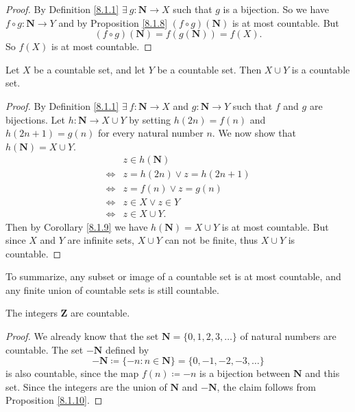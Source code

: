 \begin{proof}
    By Definition \ref{8.1.1} \(\exists\ g : \mathbf{N} \to X\) such that \(g\) is a bijection.
    So we have \(f \circ g : \mathbf{N} \to Y\) and by Proposition \ref{8.1.8} \((f \circ g)(\mathbf{N})\) is at most countable.
    But
    \[
        (f \circ g)(\mathbf{N}) = f(g(\mathbf{N})) = f(X).
    \]
    So \(f(X)\) is at most countable.
\end{proof}

\begin{proposition}\label{8.1.10}
    Let \(X\) be a countable set, and let \(Y\) be a countable set.
    Then \(X \cup Y\) is a countable set.
\end{proposition}

\begin{proof}
    By Definition \ref{8.1.1} \(\exists\ f : \mathbf{N} \to X\) and \(g : \mathbf{N} \to Y\) such that \(f\) and \(g\) are bijections.
    Let \(h : \mathbf{N} \to X \cup Y\) by setting \(h(2n) = f(n)\) and \(h(2n + 1) = g(n)\) for every natural number \(n\).
    We now show that \(h(\mathbf{N}) = X \cup Y\).
    \begin{align*}
             & z \in h(\mathbf{N})          \\
        \iff & z = h(2n) \lor z = h(2n + 1) \\
        \iff & z = f(n) \lor z = g(n)       \\
        \iff & z \in X \lor z \in Y         \\
        \iff & z \in X \cup Y.
    \end{align*}
    Then by Corollary \ref{8.1.9} we have \(h(\mathbf{N}) = X \cup Y\) is at most countable.
    But since \(X\) and \(Y\) are infinite sets, \(X \cup Y\) can not be finite, thus \(X \cup Y\) is countable.
\end{proof}

\begin{note}
    To summarize, any subset or image of a countable set is at most countable, and any finite union of countable sets is still countable.
\end{note}

\begin{corollary}\label{8.1.11}
    The integers \(\mathbf{Z}\) are countable.
\end{corollary}

\begin{proof}
    We already know that the set \(\mathbf{N} = \{0, 1, 2, 3, \dots\}\) of natural numbers are countable.
    The set \(-\mathbf{N}\) defined by
    \[
        -\mathbf{N} \coloneqq \{-n : n \in \mathbf{N}\} = \{0, -1, -2, -3, \dots\}
    \]
    is also countable, since the map \(f(n) \coloneqq -n\) is a bijection between \(\mathbf{N}\) and this set.
    Since the integers are the union of \(\mathbf{N}\) and \(-\mathbf{N}\), the claim follows from Proposition \ref{8.1.10}.
\end{proof}

